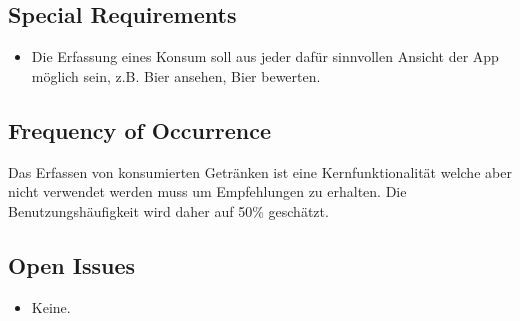 \documentclass[10pt,a4paper]{scrartcl}
\begin{document}
\subsection*{Special Requirements}

\begin{itemize}
\item Die Erfassung eines Konsum soll aus jeder dafür sinnvollen Ansicht der App möglich sein, z.B. Bier ansehen, Bier bewerten.
\end{itemize}



\subsection*{Frequency of Occurrence}

Das Erfassen von konsumierten Getränken ist eine Kernfunktionalität welche aber nicht verwendet werden muss um Empfehlungen zu erhalten. Die Benutzungshäufigkeit wird daher auf 50\% geschätzt.

\subsection*{Open Issues}

\begin{itemize}
\item Keine.
\end{itemize}
\end{document}
